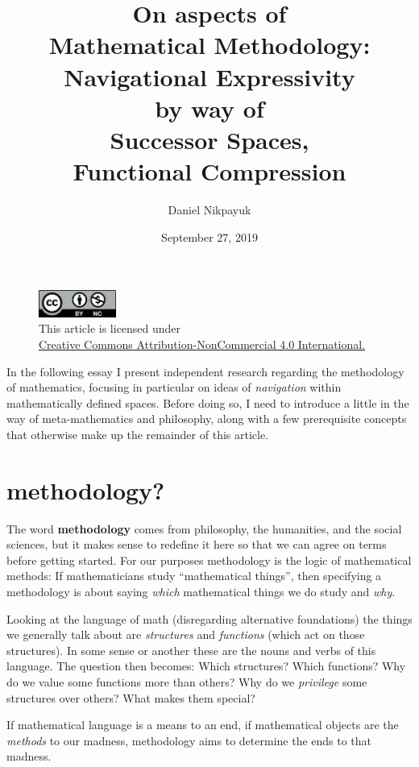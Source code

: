\documentclass[twoside]{article}
\title{On aspects of\\Mathematical Methodology:\\Navigational Expressivity\\by way of\\Successor Spaces,\\Functional Compression}
\author{Daniel Nikpayuk}
\date{September 27, 2019}
\begin{document}
\maketitle

\begin{figure}[h]
\centering
\includegraphics[width=1in]{cc-by-nc.png}\\[0.1in]
\tiny This article is licensed under \\
\href{http://creativecommons.org/licenses/by-nc/4.0/}
{Creative Commons Attribution-NonCommercial 4.0 International.}\\[0.3in]
\end{figure}

In the following essay I present independent research regarding the methodology of mathematics, focusing in
particular on ideas of \emph{navigation} within mathematically defined spaces. Before doing so, I need to introduce
a little in the way of meta-mathematics and philosophy, along with a few prerequisite concepts that otherwise make
up the remainder of this article.

\section*{methodology?}

The word {\bfseries methodology} comes from philosophy, the humanities, and the social sciences, but it makes sense
to redefine it here so that we can agree on terms before getting started. For our purposes methodology is the logic
of mathematical methods: If mathematicians study ``mathematical things'', then specifying a methodology is about
saying \emph{which} mathematical things we do study and \emph{why}.

Looking at the language of math (disregarding alternative foundations) the things we generally talk about are
\emph{structures} and \emph{functions} (which act on those structures). In some sense or another these are
the nouns and verbs of this language. The question then becomes: Which structures? Which functions? Why do
we value some functions more than others? Why do we \emph{privilege} some structures over others? What makes
them special?

If mathematical language is a means to an end, if mathematical objects are the \emph{methods} to our madness,
methodology aims to determine the ends to that madness.
\end{document}
